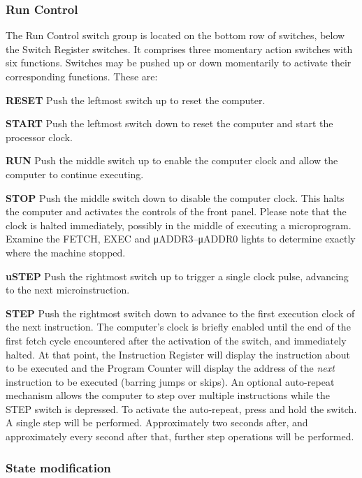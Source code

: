 \documentclass[11pt,a4paper,twocolumns]{article}
\newcommand{\lt}[1]{\textsf{#1}}
\newcommand{\sw}[1]{\textsf{#1}}
\begin{document}
\subsubsection{Run Control}

The Run Control switch group is located on the bottom row of switches,
below the Switch Register switches. It comprises three momentary
action switches with six functions. Switches may be pushed up or down
momentarily to activate their corresponding functions. These are:

\begin{description}
\item{\bf\sw{RESET}} Push the leftmost switch up to reset the
computer.
\item{\bf\sw{START}} Push the leftmost switch down to reset the
computer and start the processor clock.
\item{\bf\sw{RUN}} Push the middle switch up to enable the computer
  clock and allow the computer to continue executing.
\item{\bf\sw{STOP}} Push the middle switch down to disable the
  computer clock. This halts the computer and activates the controls
  of the front panel. Please note that the clock is halted
  immediately, possibly in the middle of executing a
  microprogram. Examine the \lt{FETCH}, \lt{EXEC} and
  \lt{μADDR3}–\lt{μADDR0} lights to determine exactly where the
  machine stopped.
\item{\bf\sw{uSTEP}} Push the rightmost switch up to trigger a single
  clock pulse, advancing to the next microinstruction.
\item{\bf\sw{STEP}} Push the rightmost switch down to advance to the
  first execution clock of the next instruction. The computer's clock
  is briefly enabled until the end of the first fetch cycle
  encountered after the activation of the switch, and immediately
  halted. At that point, the Instruction Register will display the
  instruction about to be executed and the Program Counter will
  display the address of the {\em next\/} instruction to be executed
  (barring jumps or skips). An optional auto-repeat mechanism allows
  the computer to step over multiple instructions while the \sw{STEP}
  switch is depressed. To activate the auto-repeat, press and hold the
  switch. A single step will be performed. Approximately two seconds
  after, and approximately every second after that, further step
  operations will be performed.
\end{description}

\subsubsection{State modification}
\end{document}
